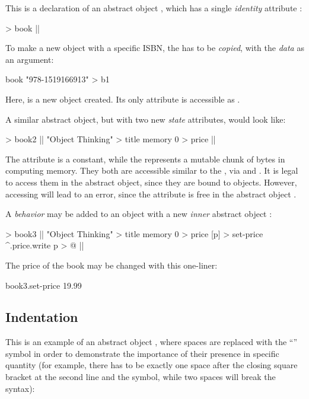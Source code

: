 This is a declaration of an abstract object ,
which has a single \emph{identity} attribute :

\begin{ffcode}
[isbn] > book |$\label{ln:book}$|
\end{ffcode}

To make a new object with a specific ISBN, the 
has to be \emph{copied}, with the \emph{data} as an argument:

\begin{ffcode}
book "978-1519166913" > b1
\end{ffcode}

Here,  is a new object created.
Its only attribute is accessible as .

A similar abstract object, but with two new \emph{state} attributes, would
look like:

\begin{ffcode}
[isbn] > book2  |$\label{ln:book2}$|
  "Object Thinking" > title
  memory 0 > price |$\label{ln:book2-end}$|
\end{ffcode}

The attribute  is a constant, while the 
represents a mutable chunk of bytes in computing memory. They both are
accessible similar to the , via 
and . It is legal to access them in the abstract
object, since they are bound to objects. However, accessing 
will lead to an error, since the attribute  is free
in the abstract object .

A \emph{behavior} may be added to an object with a new \emph{inner}
abstract object :

\begin{ffcode}
[isbn] > book3 |$\label{ln:book3}$|
  "Object Thinking" > title
  memory 0 > price
  [p] > set-price
    ^.price.write p > @ |$\label{ln:book3-end}$|
\end{ffcode}

The price of the book may be changed with this one-liner:

\begin{ffcode}
book3.set-price 19.99
\end{ffcode}

\subsection{Indentation}

This is an example of an abstract object , where
spaces are replaced with the ``\textvisiblespace'' symbol in order to demonstrate
the importance of their presence in specific quantity
(for example, there has to be exactly one space after the closing square bracket at the
second line and the \ff{>} symbol, while two spaces will break the syntax):

